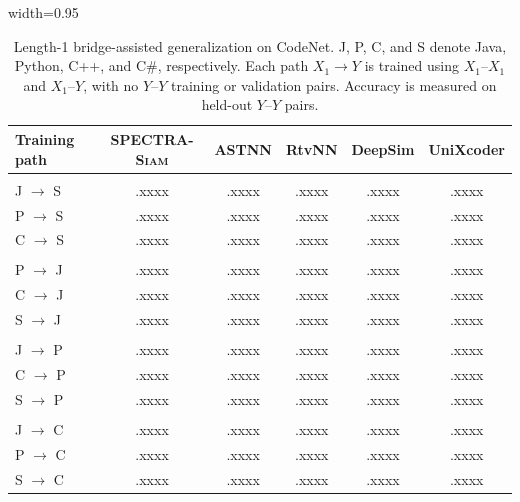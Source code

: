 \documentclass[final,5p,times,twocolumn]{elsarticle}
\newcommand{\method}{\textsc{SPECTRA-Siam}}
\theoremstyle{plain}
\begin{document}
\begin{table}[!htbp]
\centering
\caption{Length-1 bridge-assisted generalization on CodeNet. J, P, C, and S denote Java, Python, C++, and C\#, respectively. Each path $X_1\!\rightarrow Y$ is trained using $X_1$--$X_1$ and $X_1$--$Y$, with no $Y$--$Y$ training or validation pairs. Accuracy is measured on held-out $Y$--$Y$ pairs.}
\label{tab:rq3_bridge_l1}

\scriptsize
\setlength{\tabcolsep}{3.0pt}
\renewcommand{\arraystretch}{1.2}

\begin{adjustbox}{width=0.95\columnwidth}
\begin{tabular}{@{}lccccc@{}}
\toprule
\textbf{Training path}
& \textbf{\method{}}
& \textbf{ASTNN}
& \textbf{RtvNN}
& \textbf{DeepSim}
& \textbf{UniXcoder} \\
\midrule

\rowcolor{black!7}
\multicolumn{6}{@{}l}{\textit{Target C\# (S)}} \\

J $\rightarrow$ S
& .xxxx & .xxxx & .xxxx & .xxxx & .xxxx \\
P $\rightarrow$ S
& .xxxx & .xxxx & .xxxx & .xxxx & .xxxx \\
C $\rightarrow$ S
& .xxxx & .xxxx & .xxxx & .xxxx & .xxxx \\

\addlinespace[1pt]
\rowcolor{black!7}
\multicolumn{6}{@{}l}{\textit{Target Java (J)}} \\

P $\rightarrow$ J
& .xxxx & .xxxx & .xxxx & .xxxx & .xxxx \\
C $\rightarrow$ J
& .xxxx & .xxxx & .xxxx & .xxxx & .xxxx \\
S $\rightarrow$ J
& .xxxx & .xxxx & .xxxx & .xxxx & .xxxx \\

\addlinespace[1pt]
\rowcolor{black!7}
\multicolumn{6}{@{}l}{\textit{Target Python (P)}} \\

J $\rightarrow$ P
& .xxxx & .xxxx & .xxxx & .xxxx & .xxxx \\
C $\rightarrow$ P
& .xxxx & .xxxx & .xxxx & .xxxx & .xxxx \\
S $\rightarrow$ P
& .xxxx & .xxxx & .xxxx & .xxxx & .xxxx \\

\addlinespace[1pt]
\rowcolor{black!7}
\multicolumn{6}{@{}l}{\textit{Target C++ (C)}} \\

J $\rightarrow$ C
& .xxxx & .xxxx & .xxxx & .xxxx & .xxxx \\
P $\rightarrow$ C
& .xxxx & .xxxx & .xxxx & .xxxx & .xxxx \\
S $\rightarrow$ C
& .xxxx & .xxxx & .xxxx & .xxxx & .xxxx \\

\bottomrule
\end{tabular}
\end{adjustbox}
\end{table}
\end{document}
